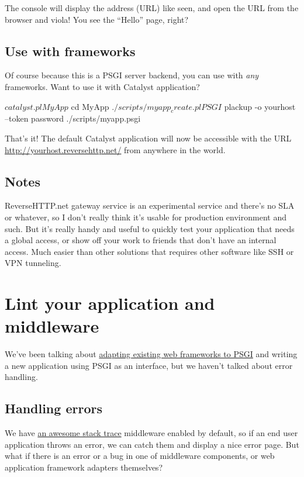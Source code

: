 The console will display the address (URL) like seen, and open the URL
from the browser and viola! You see the ``Hello'' page, right?

\section{Use with frameworks}\label{use-with-frameworks}

Of course because this is a PSGI server backend, you can use with
\emph{any} frameworks. Want to use it with Catalyst application?

\begin{shell}
$ catalyst.pl MyApp
$ cd MyApp
$ ./scripts/myapp_create.pl PSGI
$ plackup -o yourhost --token password ./scripts/myapp.psgi
\end{shell}

That's it! The default Catalyst application will now be accessible with
the URL \url{http://yourhost.reversehttp.net/} from anywhere in the world.

\section{Notes}\label{notes}

ReverseHTTP.net gateway service is an experimental service and there's
no SLA or whatever, so I don't really think it's usable for production
environment and such. But it's really handy and useful to quickly test
your application that needs a global access, or show off your work to
friends that don't have an internal access. Much easier than other
solutions that requires other software like SSH or VPN tunneling.

\chapter{Lint your application and
middleware}\label{day-21-lint-your-application-and-middleware}

We've been talking about
\href{http://advent.plackperl.org/2009/12/day-8-adapting-web-frameworks-to-psgi.html}{adapting
existing web frameworks to PSGI} and writing a new application using
PSGI as an interface, but we haven't talked about error handling.

\section{Handling errors}\label{handling-errors}

We have
\href{http://advent.plackperl.org/2009/12/day-3-using-plackup.html}{an
awesome stack trace} middleware enabled by default, so if an end user
application throws an error, we can catch them and display a nice error
page. But what if there is an error or a bug in one of middleware
components, or web application framework adapters themselves?

